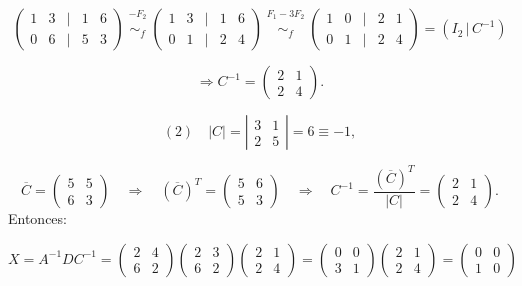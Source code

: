 \documentclass[a4paper,12pt]{article}
\begin{document}
\begin{ejercicio}[title=Ejercicio 19]
\[
\begin{pmatrix}
1 & 3 &\Big|& 1 & 6\\
0 & 6 &\Big|& 5 & 3
\end{pmatrix}
\overset{\substack{-F_2 \\ {}}}{\sim_f}
\begin{pmatrix}
1 & 3 &\Big|& 1 & 6\\
0 & 1 &\Big|& 2 & 4
\end{pmatrix}
\overset{\substack{F_1 - 3F_2 \\ {}}}{\sim_f}
\begin{pmatrix}
1 & 0 &\Big|& 2 & 1\\
0 & 1 &\Big|& 2 & 4
\end{pmatrix}
= (I_2 \,|\, C^{-1})
\]

\[
\Rightarrow C^{-1} =
\begin{pmatrix}
2 & 1\\
2 & 4
\end{pmatrix}.
\]

\[
(2)\quad |C| =
\left|
\begin{matrix}
3 & 1\\
2 & 5
\end{matrix}
\right|
= 6 \equiv -1,
\]

\[
\overline{C} =
\begin{pmatrix}
5 & 5\\
6 & 3
\end{pmatrix}
\quad\Rightarrow\quad
(\overline{C})^T =
\begin{pmatrix}
5 & 6\\
5 & 3
\end{pmatrix}
\quad\Rightarrow\quad
C^{-1} = \frac{(\overline{C})^T}{|C|} =
\begin{pmatrix}
2 & 1\\
2 & 4
\end{pmatrix}.
\]
Entonces:

\[
X = A^{-1} D C^{-1} =
\begin{pmatrix}
2 & 4\\
6 & 2
\end{pmatrix}
\begin{pmatrix}
2 & 3\\
6 & 2
\end{pmatrix}
\begin{pmatrix}
2 & 1\\
2 & 4
\end{pmatrix}
=
\begin{pmatrix}
0 & 0\\
3 & 1
\end{pmatrix}
\begin{pmatrix}
2 & 1\\
2 & 4
\end{pmatrix}
=
\boxed{\begin{pmatrix}0 & 0\\[4pt]1 & 0\end{pmatrix}\,}
\]


\end{ejercicio}
\end{document}
